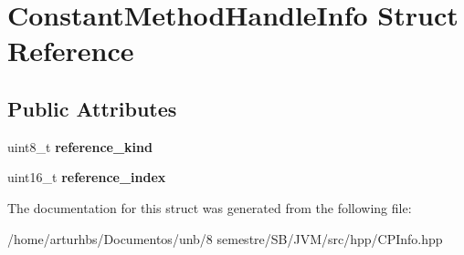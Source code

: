 \hypertarget{structConstantMethodHandleInfo}{}\section{Constant\+Method\+Handle\+Info Struct Reference}
\label{structConstantMethodHandleInfo}
\subsection*{Public Attributes}
\begin{DoxyCompactItemize}
\item 
uint8\+\_\+t {\bfseries reference\+\_\+kind}\hypertarget{structConstantMethodHandleInfo_a19082afa217fc474c3d503bd131f57f4}{}\label{structConstantMethodHandleInfo_a19082afa217fc474c3d503bd131f57f4}

\item 
uint16\+\_\+t {\bfseries reference\+\_\+index}\hypertarget{structConstantMethodHandleInfo_a462157c35f7dbacfdb538d8b8ec387b3}{}\label{structConstantMethodHandleInfo_a462157c35f7dbacfdb538d8b8ec387b3}

\end{DoxyCompactItemize}


The documentation for this struct was generated from the following file\+:\begin{DoxyCompactItemize}
\item 
/home/arturhbs/\+Documentos/unb/8 semestre/\+S\+B/\+J\+V\+M/src/hpp/C\+P\+Info.\+hpp\end{DoxyCompactItemize}
